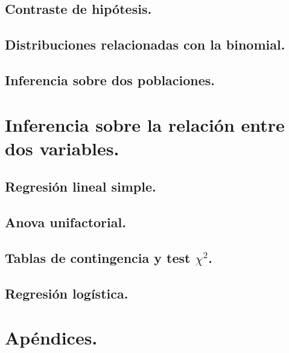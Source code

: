 \documentclass[10pt,a4paper]{book}
\begin{document}
\chapter{Contraste de hipótesis.}
\label{cap:ContrasteHipotesis}



\chapter{Distribuciones relacionadas con la binomial.}
\label{cap:DistribucionesRelacionadasBinomial}


\chapter{Inferencia sobre dos poblaciones.}
\label{cap:Inferencia2Poblaciones}



\part{Inferencia sobre la relación entre dos variables.}
\label{parte:InferenciaRelacion2Variables}


\chapter{Regresión lineal simple.}
\label{cap:RegresionLinealSimple}


\chapter{Anova unifactorial.}
\label{cap:IntroduccionAnova}


\chapter{Tablas de contingencia y test $\chi^2$.}
\label{cap:TablasContingenciaTestChi2}


\chapter{Regresión logística.}
\label{cap:RegresionLogistica}



\newpage
\part*{Apéndices.}
\appendix
\end{document}
